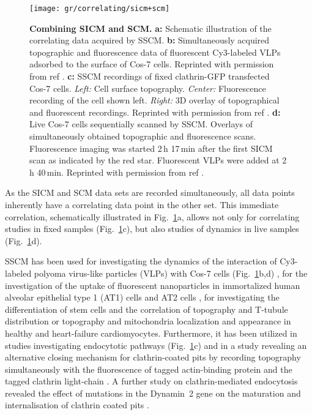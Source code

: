 \begin{figure}
  \texttt{[image: gr/correlating/sicm+scm]}
  \caption{%
    \textbf{Combining SICM and SCM.}
    \textbf{a:} Schematic illustration of the correlating data acquired by SSCM.
    \textbf{b:} Simultaneously acquired topographic and fluorescence data of fluorescent Cy3-labeled 
    VLPs adsorbed to the surface of Cos-7 cells. Reprinted with permission from ref \cite{Gorelik2002a}.
    \textbf{c:} SSCM recordings of fixed clathrin-GFP transfected Cos-7 cells. 
    	\textit{Left:} Cell surface topography. 
    	\textit{Center:} Fluorescence recording of the cell shown left. 
    	\textit{Right:} 3D overlay of topographical and fluorescent recordings. 
    Reprinted with permission from ref \cite{Shevchuk2008}.
    \textbf{d:} Live Cos-7 cells sequentially scanned by SSCM. Overlays of simultaneously obtained 
    topographic and fluorescence scans. Fluorescence imaging was started 2\,h 17\,min after the first 
    SICM scan as indicated by the red star. Fluorescent VLPs were added at 2\,h 40\,min. 
    Reprinted with permission from ref \cite{Gorelik2002}.
  }
  \label{fig:sicm+scm}
\end{figure}

As the SICM and SCM data sets are recorded simultaneously, all data points inherently have a
correlating data point in the other set. This immediate correlation, schematically illustrated in
Fig.~\ref{fig:sicm+scm}a, allows not only for correlating studies in fixed
samples (Fig.~\ref{fig:sicm+scm}c), but also studies of dynamics in live
samples (Fig.~\ref{fig:sicm+scm}d).



SSCM has been used for investigating the dynamics of the interaction of
Cy3-labeled polyoma virus-like particles (VLPs) with Cos-7 cells
(Fig.~\ref{fig:sicm+scm}b,d) \cite{Gorelik2002a}, for the investigation of the
uptake of fluorescent nanoparticles in immortalized human alveolar epithelial
type 1 (AT1) cells and AT2 cells \cite{Kemp2008,Novak2014}, for investigating
the differentiation of stem cells \cite{Gorelik2008} and the correlation of
topography and T-tubule distribution \cite{Lyon2012} or topography and
mitochondria localization and appearance \cite{Miragoli2016} in healthy and 
heart-failure cardiomyocytes. Furthermore, it has been utilized in 
studies investigating endocytotic pathways \cite{Shevchuk2008}
(Fig.~\ref{fig:sicm+scm}c) and in a study revealing an alternative closing
mechanism for clathrin-coated pits by recording topography simultaneously with
the fluorescence of tagged actin-binding protein and the tagged clathrin
light-chain \cite{Shevchuk2012}. A further study on clathrin-mediated
endocytosis revealed the effect of mutations in the Dynamin~2 gene on the
maturation and internalisation of clathrin coated pits \cite{Ali2019}.

